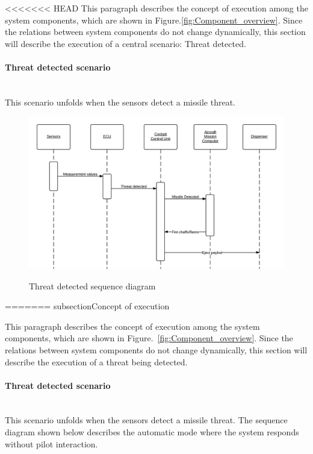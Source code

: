 <<<<<<< HEAD
This paragraph describes the concept of execution among the system components, which are shown in Figure.\ref{fig:Component_overview}. Since the relations between system 
components do not change dynamically, this section will describe the execution of a central scenario: Threat detected.

\paragraph{Threat detected scenario}\mbox{}\\
This scenario unfolds when the sensors detect a missile threat.



\begin{figure}[h]
	\centering
	\includegraphics[scale=0.2]{./images/threatDetectedSequenceDiagram.png}\\
	\caption{Threat detected sequence diagram}
    \label{fig:threatDetectedSeqDia}
\end{figure}
=======
subsection{Concept of execution}

This paragraph describes the concept of execution among the system components, which are shown in Figure.~\ref{fig:Component_overview}. Since the relations between system 
components do not change dynamically, this section will describe the execution of a threat being detected.

\paragraph{Threat detected scenario}\mbox{}\\
This scenario unfolds when the sensors detect a missile threat. The sequence diagram shown below describes the automatic mode where the system responds without pilot 
interaction.

